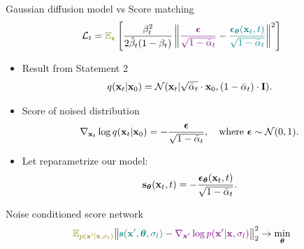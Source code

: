 \begin{frame}{Gaussian diffusion model vs Score matching}
	\vspace{-0.3cm}
	\[
		\cL_t = {\color{olive}\bbE_{\bepsilon}} \left[ \frac{\beta_t^2}{2\tilde{\beta}_t (1 - \beta_t)} \left\| {\color{violet}\frac{\bepsilon}{\sqrt{1 - \bar{\alpha}_t}}} - {\color{teal}\frac{\bepsilon_{\btheta}(\bx_t, t)}{\sqrt{1 - \bar{\alpha}_t}}}\right\|^2 \right]
	\]
	\begin{itemize}
		\item Result from Statement 2
		\[
			q(\mathbf{x}_t | \mathbf{x}_0) = \mathcal{N}(\mathbf{x}_t | \sqrt{\bar{\alpha}_t} \cdot \mathbf{x}_0, (1 - \bar{\alpha}_t) \cdot \mathbf{I}).
		\]
		\item Score of noised distribution
		\[
			\nabla_{\mathbf{x}_t} \log q(\mathbf{x}_t | \mathbf{x}_0) = - \frac{\boldsymbol{\epsilon}}{\sqrt{1 - \bar{\alpha}_t}}, \quad \text{where } \boldsymbol{\epsilon} \sim \mathcal{N}(0, 1).
		\]
		\item Let reparametrize our model: 
		\[
			\mathbf{s}_{\boldsymbol{\theta}}(\mathbf{x}_t, t) = - \frac{\boldsymbol{\epsilon}_{\boldsymbol{\theta}}(\mathbf{x}_t, t)}{\sqrt{1 - \bar{\alpha}_t}}.
		\]
	\end{itemize}
	\begin{block}{Noise conditioned score network}
		\vspace{-0.2cm}
		\[
			{\color{olive}\bbE_{p(\bx' | \bx, \sigma_l)}}\bigl\| {\color{teal}\bs(\bx', \btheta, \sigma_l)} - {\color{violet}\nabla_{\bx'} \log p(\bx' | \bx, \sigma_l)} \bigr\|^2_2 \rightarrow \min_{\btheta}
		\]
	\end{block}
	\end{frame}
